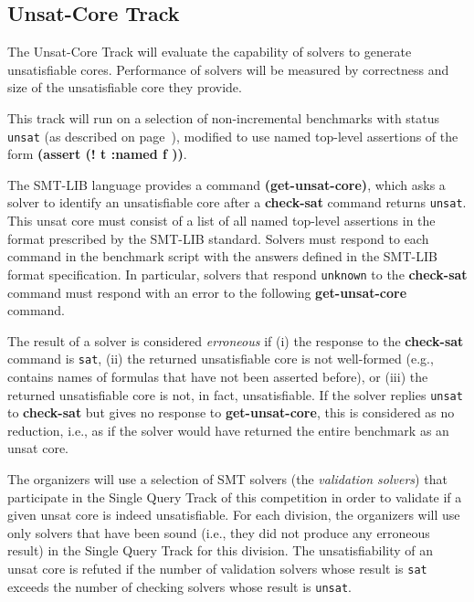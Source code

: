 \documentclass[12pt]{article}
\newcommand{\akey}[1]{\textbf{#1}\xspace}
\newcommand{\maintrack}{Single Query Track\xspace}
\newcommand{\inctrack}{Incremental Track\xspace}
\newcommand{\ucoretrack}{Unsat-Core Track\xspace}
\begin{document}

\subsection{\ucoretrack}
\label{sec:exec:unsat-core}

The \ucoretrack will evaluate the capability of solvers to generate
unsatisfiable cores.  Performance of solvers will be measured by correctness
and size of the unsatisfiable core they provide.

This track will run on a selection of non-incremental benchmarks with status
\texttt{unsat} (as described on page~\pageref{benchmark-selection}), modified
to use named top-level assertions of the form \akey{(assert (! t :named f ))}.


The SMT-LIB language provides a command \akey{(get-unsat-core)}, which asks
a solver to identify an unsatisfiable core after a \akey{check-sat}
command returns \texttt{unsat}.
This unsat core must consist of a list of all named top-level
assertions in the format prescribed by the SMT-LIB standard.
%
Solvers must respond to each command in the benchmark script with the
answers defined in the SMT-LIB format specification.  In particular,
solvers that respond \texttt{unknown} to the \akey{check-sat} command
must respond with an error to the following \akey{get-unsat-core}
command.

The result of a solver is considered \emph{erroneous} if (i) the
response to the \akey{check-sat} command is \texttt{sat}, (ii) the
returned unsatisfiable core is not well-formed (e.g., contains names of
formulas that have not been asserted before), or (iii) the returned
unsatisfiable core is not, in fact, unsatisfiable.
%
If the solver replies \texttt{unsat} to \akey{check-sat} but gives no
response to \akey{get-unsat-core}, this is considered as no reduction, i.e.,
as if the solver would have returned the entire benchmark as an unsat
core.

The organizers will use a selection of SMT solvers (the \emph{validation
solvers}) that participate in the \maintrack of this competition in order to
validate if a given unsat core is indeed unsatisfiable.  For each division, the
organizers will use only solvers that have been sound (i.e., they did not
produce any erroneous result) in the \maintrack for this division.  The
unsatisfiability of an unsat core is refuted if the number of validation
solvers whose result is \texttt{sat} exceeds the number of checking solvers
whose result is \texttt{unsat}.
\end{document}
